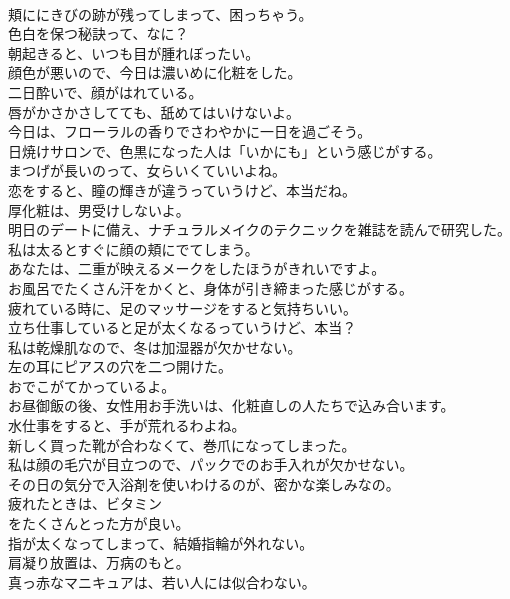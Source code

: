 \documentclass[8pt]{extreport}
\begin{document}
\begin{CJK}{UTF8}{min}
\\	頬ににきびの跡が残ってしまって、困っちゃう。	
\\	色白を保つ秘訣って、なに？	
\\	朝起きると、いつも目が腫れぼったい。	
\\	顔色が悪いので、今日は濃いめに化粧をした。	
\\	二日酔いで、顔がはれている。	
\\	唇がかさかさしてても、舐めてはいけないよ。	
\\	今日は、フローラルの香りでさわやかに一日を過ごそう。	
\\	日焼けサロンで、色黒になった人は「いかにも」という感じがする。	
\\	まつげが長いのって、女らいくていいよね。	
\\	恋をすると、瞳の輝きが違うっていうけど、本当だね。	
\\	厚化粧は、男受けしないよ。	
\\	明日のデートに備え、ナチュラルメイクのテクニックを雑誌を読んで研究した。	
\\	私は太るとすぐに顔の頬にでてしまう。	
\\	あなたは、二重が映えるメークをしたほうがきれいですよ。	
\\	お風呂でたくさん汗をかくと、身体が引き締まった感じがする。	
\\	疲れている時に、足のマッサージをすると気持ちいい。	
\\	立ち仕事していると足が太くなるっていうけど、本当？	
\\	私は乾燥肌なので、冬は加湿器が欠かせない。	
\\	左の耳にピアスの穴を二つ開けた。	
\\	おでこがてかっているよ。	
\\	お昼御飯の後、女性用お手洗いは、化粧直しの人たちで込み合います。	
\\	水仕事をすると、手が荒れるわよね。	
\\	新しく買った靴が合わなくて、巻爪になってしまった。	
\\	私は顔の毛穴が目立つので、パックでのお手入れが欠かせない。	
\\	その日の気分で入浴剤を使いわけるのが、密かな楽しみなの。	
\\	疲れたときは、ビタミン
\\	をたくさんとった方が良い。	
\\	指が太くなってしまって、結婚指輪が外れない。	
\\	肩凝り放置は、万病のもと。	
\\	真っ赤なマニキュアは、若い人には似合わない。	

\end{CJK}
\end{document}
